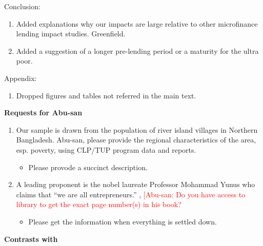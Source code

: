 Conclusion:
\begin{enumerate}
\vspace{1.0ex}\setlength{\itemsep}{1.0ex}\setlength{\baselineskip}{12pt}
\item	Added explanations why our impacts are large relative to other microfinance lending impact studies. Greenfield.
\item	Added a suggestion of a longer pre-lending period or a maturity for the ultra poor.
\end{enumerate}
Appendix:
\begin{enumerate}
\vspace{1.0ex}\setlength{\itemsep}{1.0ex}\setlength{\baselineskip}{12pt}
\item	Dropped figures and tables not referred in the main text.
\end{enumerate}
\textbf{Requests for Abu-san}
\begin{enumerate}
\vspace{1.0ex}\setlength{\itemsep}{1.0ex}\setlength{\baselineskip}{12pt}
\item		Our sample is drawn from the population of river island villages in Northern Bangladesh. Abu-san, please provide the regional characteristics of the area, esp. poverty, using CLP/TUP program data and reports. 
	\begin{itemize}
	\vspace{1.0ex}\setlength{\itemsep}{1.0ex}\setlength{\baselineskip}{12pt}
	\item	Please provode a succinct description.
	\end{itemize}
\item	A leading proponent is the nobel laureate Professor Mohammad Yunus who claims that ``we are all entrepreneurs.'' \citet{Yunus2003}, \citet{Cosic2017} \textcolor{red}{[Abu-san: Do you have access to library to get the exact page number(s) in his book?}
	\begin{itemize}
	\vspace{1.0ex}\setlength{\itemsep}{1.0ex}\setlength{\baselineskip}{12pt}
	\item	Please get the information when everything is settled down.
	\end{itemize}
\end{enumerate}


\textbf{\textbf{Contrasts with \citet{Balboni2020}}}
\setlength{\parindent}{1em}

